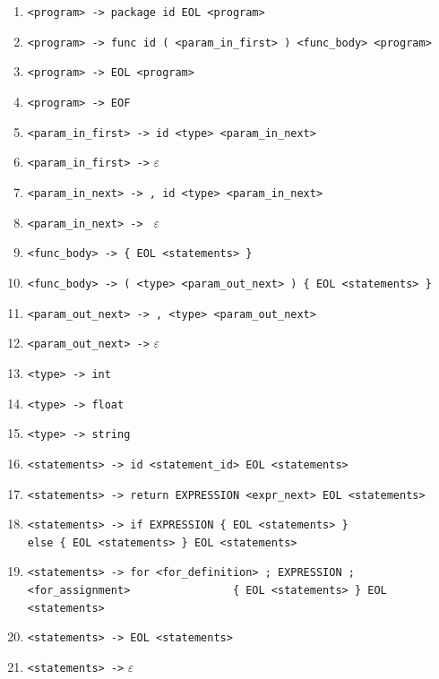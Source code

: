 \documentclass[a4paper, 12pt]{article}
\begin{document}
		\begin{enumerate}[noitemsep]
		
            \item \verb|<program> -> package id EOL <program>| 
            \item \verb|<program> -> func id ( <param_in_first> ) <func_body> <program>|
            \item \verb|<program> -> EOL <program>|
            \item \verb|<program> -> EOF |
            
            \item \verb|<param_in_first> -> id <type> <param_in_next> |
            \item \verb|<param_in_first> ->| $\varepsilon$
            \item \verb|<param_in_next> -> , id <type> <param_in_next>|
            \item \verb|<param_in_next> -> | $\varepsilon$
            
            \item \verb|<func_body> -> { EOL <statements> }|
            \item \verb|<func_body> -> ( <type> <param_out_next> ) { EOL <statements> } |
            
            \item \verb|<param_out_next> -> , <type> <param_out_next> |
            \item \verb|<param_out_next> ->| $\varepsilon$
            
            \item \verb|<type> -> int|
            \item \verb|<type> -> float| 
            \item \verb|<type> -> string|
            
            \item \verb|<statements> -> id <statement_id> EOL <statements>|
            \item \verb|<statements> -> return EXPRESSION <expr_next> EOL <statements>|
            \item \verb|<statements> -> if EXPRESSION { EOL <statements> }|\newline \verb|                else { EOL <statements> } EOL <statements>|
            \item \verb|<statements> -> for <for_definition> ; EXPRESSION ; <for_assignment>|\newline \verb|                { EOL <statements> } EOL <statements>|
            \item \verb|<statements> -> EOL <statements>|
            \item \verb|<statements> ->| $\varepsilon$
            

\end{enumerate}
\end{document}
